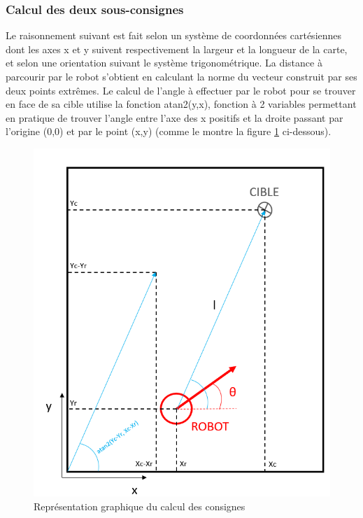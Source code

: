 \documentclass[a4paper,11pt]{article}
\begin{document}
\subsubsection{\label{subsubsec:sous}Calcul des deux sous-consignes}

Le raisonnement suivant est fait selon un système de coordonnées cartésiennes dont les axes x et y suivent respectivement la largeur et la longueur de la carte, et selon une orientation suivant le système trigonométrique. La distance à parcourir par le robot s'obtient en calculant la norme du vecteur construit par ses deux points extrêmes. Le calcul de l'angle à effectuer par le robot pour se trouver en face de sa cible utilise la fonction atan2(y,x), fonction à 2 variables permettant en pratique de trouver l'angle entre l'axe des x positifs et la droite passant par l'origine (0,0) et par le point (x,y) \cite{cochelin_positionnement_nodate} (comme le montre la figure \ref{fig:atan} ci-dessous).

\begin{figure}[H]
    \centering
    \includegraphics[scale = 0.75]{atan2.PNG}
    \caption{Représentation graphique du calcul des consignes}
    \label{fig:atan}
\end{figure}\\
\end{document}
